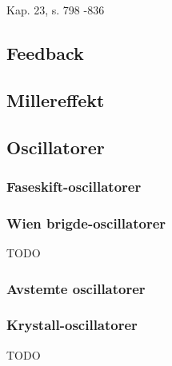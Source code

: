 Kap. 23, s. 798 -836

\subsection{Feedback}
  
\subsection{Millereffekt}
  
\subsection{Oscillatorer}
  
  \subsubsection{Faseskift-oscillatorer}
    
  \subsubsection{Wien brigde-oscillatorer}
    TODO
  \subsubsection{Avstemte oscillatorer}
    
  \subsubsection{Krystall-oscillatorer}
    TODO
